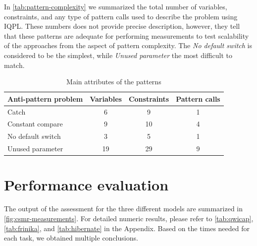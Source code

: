 In \autoref{tab:pattern-complexity} we summarized the total number of variables, constraints, and any type of pattern calls used to describe the problem using IQPL. These numbers does not provide precise description, however, they tell that these patterns are adequate for performing measurements to test scalability of the approaches from the aspect of pattern complexity. The \emph{No default switch} is considered to be the simplest, while \emph{Unused parameter} the most difficult to match. 

\begin{table}[!htpb]
	\centering
	\begin{tabular}{l|ccc}
		\hline
 Anti-pattern problem & Variables & Constraints & Pattern calls\\
		\hline
 Catch 			& 6 	& 9 	& 1	\\
 Constant compare & 9 	& 10 	& 4	\\
 No default switch & 3 	& 5 	& 1	\\
 Unused parameter & 19 	& 29 	& 9 \\
		\hline
	\end{tabular}
	\caption{Main attributes of the patterns}
	\label{tab:pattern-complexity}
\end{table}


\section{Performance evaluation}
\label{sec:performance-evaluation}
The output of the assessment for the three different models are summarized in \autoref{fig:csmr-measurements}. For detailed numeric results, please refer to \autoref{tab:qwicap}, \autoref{tab:frinika}, and \autoref{tab:hibernate} in the Appendix. Based on the times needed for each task, we obtained multiple conclusions. 


